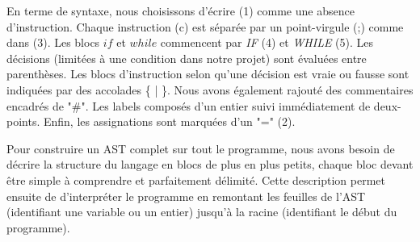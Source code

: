 \documentclass[a4paper]{article}
\begin{document}
En terme de syntaxe, nous choisissons d'écrire (1) comme une absence d'instruction. Chaque instruction (c) est séparée par un point-virgule (;) comme dans (3). Les blocs $if$ et $while$ commencent par \textit{IF} (4) et \textit{WHILE} (5). Les décisions (limitées à une condition dans notre projet) sont évaluées entre parenthèses. Les blocs d'instruction selon qu'une décision est vraie ou fausse sont indiquées par des accolades \{ | \}. Nous avons également rajouté des commentaires encadrés de "\#". Les labels composés d'un entier suivi immédiatement de deux-points. Enfin, les assignations sont marquées d'un "=" (2). 

Pour construire un AST complet sur tout le programme, nous avons besoin de décrire la structure du langage en blocs de plus en plus petits, chaque bloc devant être simple à comprendre et parfaitement délimité. Cette description permet ensuite de d'interpréter le programme en remontant les feuilles de l'AST (identifiant une variable ou un entier) jusqu'à la racine (identifiant le début du programme). 
\end{document}
